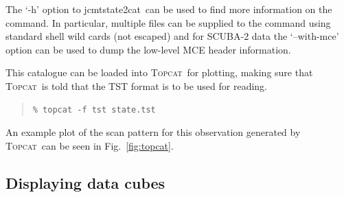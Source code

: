 \documentclass[twoside,11pt]{article}
\newcommand{\xref}[3]{#1}
\newcommand{\xlabel}[1]{}
\renewcommand{\_}{\texttt{\symbol{95}}}
\newenvironment{myquote}{\begin{quote}\begin{small}}{\end{small}\end{quote}}
\newcommand{\topcat}{\xref{\textsc{Topcat}}{sun253}{}}
\newcommand{\task}[1]{\textsf{#1}}
\newcommand{\jcmtstate}{\xref{\task{jcmtstate2cat}}{sun258}{JCMTSTATE2CAT}}
\begin{document}
The `-h' option to \jcmtstate\ can be used to find more information on
the command. In particular, multiple files can be supplied to the
command using standard shell wild cards (not escaped) and for SCUBA-2
data the `--with-mce' option can be used to dump the low-level MCE
header information.

This catalogue can be loaded into \topcat\ for plotting, making sure
that \topcat\ is told that the TST format is to be used for reading.

\begin{myquote}
\begin{verbatim}
% topcat -f tst state.tst
\end{verbatim}
\end{myquote}

An example plot of the scan pattern for this observation generated by
\topcat\ can be seen in Fig.~\ref{fig:topcat}.

\subsection{\xlabel{display_cube}Displaying data cubes}
\end{document}
